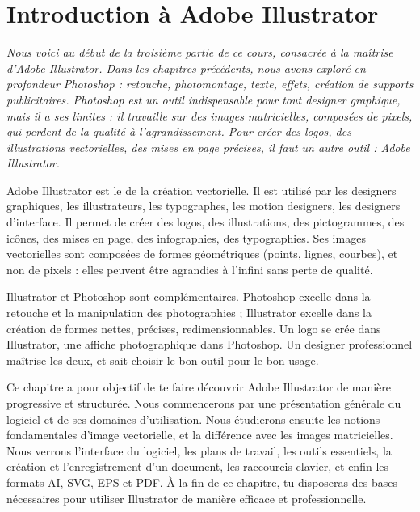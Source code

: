 
\chapter{Introduction à Adobe Illustrator}

\noindent
\textit{Nous voici au début de la troisième partie de ce cours, consacrée à la maîtrise d'Adobe Illustrator. Dans les chapitres précédents, nous avons exploré en profondeur Photoshop : retouche, photomontage, texte, effets, création de supports publicitaires. Photoshop est un outil indispensable pour tout designer graphique, mais il a ses limites : il travaille sur des images matricielles, composées de pixels, qui perdent de la qualité à l'agrandissement. Pour créer des logos, des illustrations vectorielles, des mises en page précises, il faut un autre outil : Adobe Illustrator.}

\vspace{1em}

\noindent
Adobe Illustrator est le  de la création vectorielle. Il est utilisé par les designers graphiques, les illustrateurs, les typographes, les motion designers, les designers d'interface. Il permet de créer des logos, des illustrations, des pictogrammes, des icônes, des mises en page, des infographies, des typographies. Ses images vectorielles sont composées de formes géométriques (points, lignes, courbes), et non de pixels : elles peuvent être agrandies à l'infini sans perte de qualité.

\vspace{1em}

\noindent
Illustrator et Photoshop sont complémentaires. Photoshop excelle dans la retouche et la manipulation des photographies ; Illustrator excelle dans la création de formes nettes, précises, redimensionnables. Un logo se crée dans Illustrator, une affiche photographique dans Photoshop. Un designer professionnel maîtrise les deux, et sait choisir le bon outil pour le bon usage.

\vspace{1em}

\noindent
Ce chapitre a pour objectif de te faire découvrir Adobe Illustrator de manière progressive et structurée. Nous commencerons par une présentation générale du logiciel et de ses domaines d'utilisation. Nous étudierons ensuite les notions fondamentales d'image vectorielle, et la différence avec les images matricielles. Nous verrons l'interface du logiciel, les plans de travail, les outils essentiels, la création et l'enregistrement d'un document, les raccourcis clavier, et enfin les formats AI, SVG, EPS et PDF. À la fin de ce chapitre, tu disposeras des bases nécessaires pour utiliser Illustrator de manière efficace et professionnelle.

